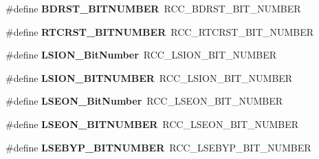 \begin{DoxyCompactItemize}
\item 
\hypertarget{group___h_a_l___r_c_c___aliased_ga8a86677bfcc1259edf9b9a5f85e7e04a}{\#define {\bfseries B\-D\-R\-S\-T\-\_\-\-B\-I\-T\-N\-U\-M\-B\-E\-R}~R\-C\-C\-\_\-\-B\-D\-R\-S\-T\-\_\-\-B\-I\-T\-\_\-\-N\-U\-M\-B\-E\-R}\label{group___h_a_l___r_c_c___aliased_ga8a86677bfcc1259edf9b9a5f85e7e04a}

\item 
\hypertarget{group___h_a_l___r_c_c___aliased_ga0cfaa60ebd031d12bff625ca896f1fd5}{\#define {\bfseries R\-T\-C\-R\-S\-T\-\_\-\-B\-I\-T\-N\-U\-M\-B\-E\-R}~R\-C\-C\-\_\-\-R\-T\-C\-R\-S\-T\-\_\-\-B\-I\-T\-\_\-\-N\-U\-M\-B\-E\-R}\label{group___h_a_l___r_c_c___aliased_ga0cfaa60ebd031d12bff625ca896f1fd5}

\item 
\hypertarget{group___h_a_l___r_c_c___aliased_ga3f9dbe50769ce2a63ae12520433b9b40}{\#define {\bfseries L\-S\-I\-O\-N\-\_\-\-Bit\-Number}~R\-C\-C\-\_\-\-L\-S\-I\-O\-N\-\_\-\-B\-I\-T\-\_\-\-N\-U\-M\-B\-E\-R}\label{group___h_a_l___r_c_c___aliased_ga3f9dbe50769ce2a63ae12520433b9b40}

\item 
\hypertarget{group___h_a_l___r_c_c___aliased_ga240275048c246bf22b5fce8ff4f7b33d}{\#define {\bfseries L\-S\-I\-O\-N\-\_\-\-B\-I\-T\-N\-U\-M\-B\-E\-R}~R\-C\-C\-\_\-\-L\-S\-I\-O\-N\-\_\-\-B\-I\-T\-\_\-\-N\-U\-M\-B\-E\-R}\label{group___h_a_l___r_c_c___aliased_ga240275048c246bf22b5fce8ff4f7b33d}

\item 
\hypertarget{group___h_a_l___r_c_c___aliased_ga9d9171281f96c7cd004520985e3ae27f}{\#define {\bfseries L\-S\-E\-O\-N\-\_\-\-Bit\-Number}~R\-C\-C\-\_\-\-L\-S\-E\-O\-N\-\_\-\-B\-I\-T\-\_\-\-N\-U\-M\-B\-E\-R}\label{group___h_a_l___r_c_c___aliased_ga9d9171281f96c7cd004520985e3ae27f}

\item 
\hypertarget{group___h_a_l___r_c_c___aliased_ga9dcf3f6a2fd518a7fd96f96280f81f8f}{\#define {\bfseries L\-S\-E\-O\-N\-\_\-\-B\-I\-T\-N\-U\-M\-B\-E\-R}~R\-C\-C\-\_\-\-L\-S\-E\-O\-N\-\_\-\-B\-I\-T\-\_\-\-N\-U\-M\-B\-E\-R}\label{group___h_a_l___r_c_c___aliased_ga9dcf3f6a2fd518a7fd96f96280f81f8f}

\item 
\hypertarget{group___h_a_l___r_c_c___aliased_ga6af20e20f5b32e8a85f607ea43c338df}{\#define {\bfseries L\-S\-E\-B\-Y\-P\-\_\-\-B\-I\-T\-N\-U\-M\-B\-E\-R}~R\-C\-C\-\_\-\-L\-S\-E\-B\-Y\-P\-\_\-\-B\-I\-T\-\_\-\-N\-U\-M\-B\-E\-R}\label{group___h_a_l___r_c_c___aliased_ga6af20e20f5b32e8a85f607ea43c338df}


\end{DoxyCompactItemize}
